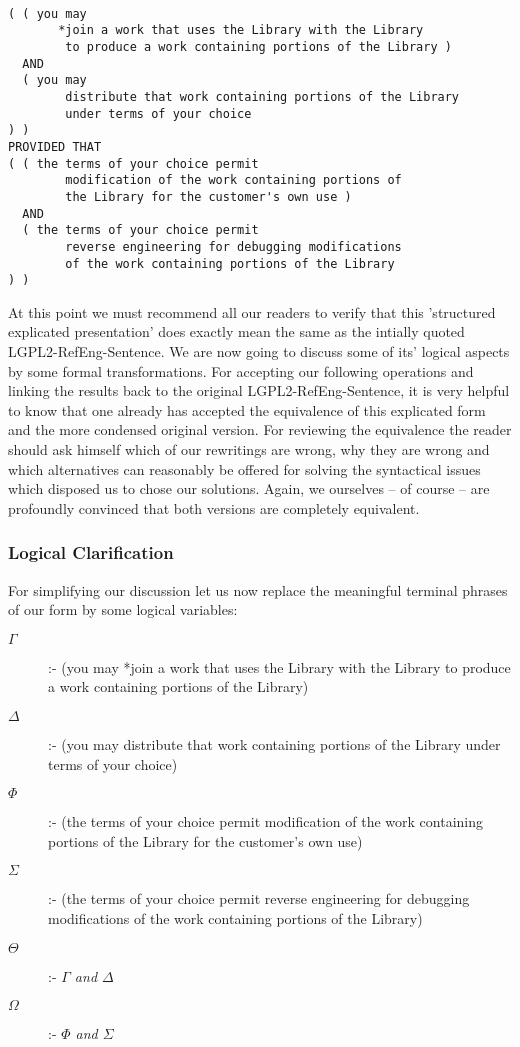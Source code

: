 \begin{verbatim}

( ( you may 
       *join a work that uses the Library with the Library
        to produce a work containing portions of the Library )
  AND 
  ( you may 
        distribute that work containing portions of the Library
        under terms of your choice 
) )
PROVIDED THAT
( ( the terms of your choice permit 
        modification of the work containing portions of 
        the Library for the customer's own use )
  AND
  ( the terms of your choice permit
        reverse engineering for debugging modifications 
        of the work containing portions of the Library   
) )
\end{verbatim}

At this point we must recommend all our readers to verify that this 'structured
explicated presentation' does exactly mean the same as the intially quoted
LGPL2-RefEng-Sentence. We are now going to discuss some of its' logical aspects
by some formal transformations. For accepting our following operations and
linking the results back to the original LGPL2-RefEng-Sentence, it is very
helpful to know that one already has accepted the equivalence of this
explicated form and the more condensed original version. For reviewing the
equivalence the reader should ask himself which of our rewritings are wrong, why
they are wrong and which alternatives can reasonably be offered for solving the
syntactical issues which disposed us to chose our solutions. Again, we ourselves
-- of course -- are profoundly convinced that both versions are completely
equivalent.

\subsubsection{Logical Clarification}

For simplifying our discussion let us now replace the meaningful terminal
phrases of our form by some logical variables:

\begin{description}
  \item[$\Gamma$] :- (you may *join a work that uses the Library with the
  Library to produce a work containing portions of the Library) 
  \item[$\Delta$] :- (you may distribute that work containing portions of the
  Library under terms of your choice)
  \item[$\Phi$] :- (the terms of your choice permit modification of the work 
  containing portions of the Library for the customer's own use)
  \item[$\Sigma$] :- (the terms of your choice permit reverse engineering for
  debugging modifications of the work containing portions of the Library)
  \item[$\Theta$] :- \emph{$\Gamma$ and $\Delta$}
  \item[$\Omega$] :- \emph{$\Phi$ and $\Sigma$}
\end{description}


